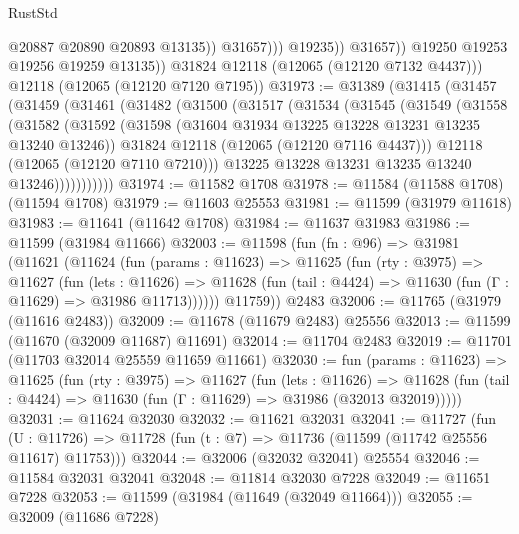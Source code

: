 \begin{lexlean}{RustStd}
\begin{coremodule}
                            @20887
                            @20890
                            @20893
                            @13135))
                        @31657)))
                  @19235))
              @31657))
          @19250
          @19253
          @19256
          @19259
          @13135))
      @31824
      @12118
      (@12065 (@12120 @7132 @4437)))
    @12118
    (@12065 (@12120 @7120 @7195))
@31973 := @31389
    (@31415
      (@31457
        (@31459
          (@31461
            (@31482
              (@31500
                (@31517
                  (@31534
                    (@31545
                      (@31549
                        (@31558
                          (@31582
                            (@31592
                              (@31598 (@31604 @31934 @13225 @13228 @13231 @13235 @13240 @13246))
                              @31824
                              @12118
                              (@12065 (@12120 @7116 @4437)))
                            @12118
                            (@12065 (@12120 @7110 @7210)))
                          @13225
                          @13228
                          @13231
                          @13235
                          @13240
                          @13246)))))))))))
@31974 := @11582 @1708
@31978 := @11584 (@11588 @1708) (@11594 @1708)
@31979 := @11603 @25553
@31981 := @11599 (@31979 @11618)
@31983 := @11641 (@11642 @1708)
@31984 := @11637 @31983
@31986 := @11599 (@31984 @11666)
@32003 := @11598
    (fun (fn : @96) =>
    @31981
      (@11621
        (@11624
          (fun (params : @11623) =>
          @11625
            (fun (rty : @3975) =>
            @11627
              (fun (lets : @11626) =>
              @11628 (fun (tail : @4424) => @11630 (fun (Γ : @11629) => @31986 @11713))))))
        @11759))
    @2483
@32006 := @11765 (@31979 (@11616 @2483))
@32009 := @11678 (@11679 @2483) @25556
@32013 := @11599 (@11670 (@32009 @11687) @11691)
@32014 := @11704 @2483
@32019 := @11701 (@11703 @32014 @25559 @11659 @11661)
@32030 := fun (params : @11623) =>
  @11625
    (fun (rty : @3975) =>
    @11627
      (fun (lets : @11626) =>
      @11628 (fun (tail : @4424) => @11630 (fun (Γ : @11629) => @31986 (@32013 @32019)))))
@32031 := @11624 @32030
@32032 := @11621 @32031
@32041 := @11727
    (fun (U : @11726) => @11728 (fun (t : @7) => @11736 (@11599 (@11742 @25556 @11617) @11753)))
@32044 := @32006 (@32032 @32041) @25554
@32046 := @11584 @32031 @32041
@32048 := @11814 @32030 @7228
@32049 := @11651 @7228
@32053 := @11599 (@31984 (@11649 (@32049 @11664)))
@32055 := @32009 (@11686 @7228)

\end{coremodule}
\end{lexlean}
